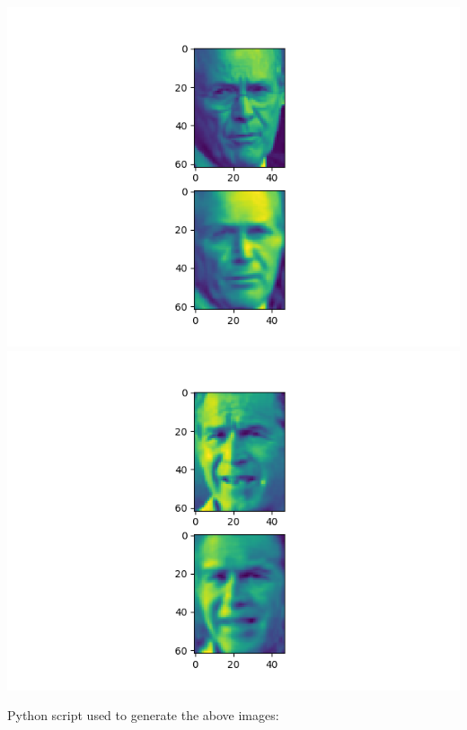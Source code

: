 \documentclass[twoside,10pt]{article}
\theoremstyle{definition}
\theoremstyle{definition}
\theoremstyle{remark}
\renewcommand{\>}{{\rightarrow}}
\newcommand{\1}{{\mathbf 1}}
\newcommand{\0}{{\mathbf 0}}
\begin{document}
\begin{enumerate}
  \includegraphics[width=\textwidth]{reconstruct_Im4.png}
  \includegraphics[width=\textwidth]{reconstruct_Im5.png}  

  Python script used to generate the above images:
  
  
  
\end{enumerate}
\end{document}
